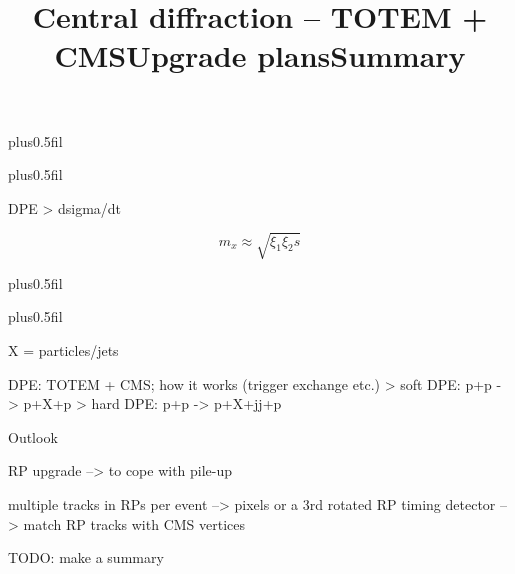 \vskip0pt plus0.5fil

\vskip0pt plus0.5fil

\newpage %
\title{}

\> DPE
\>> dsigma/dt

$$m_x \approx \sqrt{\xi_1 \xi_2 s}$$

\newpage %
\hbox{}
\vfil
\title{Central diffraction -- TOTEM + CMS}

\vskip0pt plus0.5fil

\vskip0pt plus0.5fil

\> X = particles/jets

\newpage %
\title{}

\> DPE: TOTEM + CMS; how it works (trigger exchange etc.)
\>> soft DPE: p+p -> p+X+p
\>> hard DPE: p+p -> p+X+jj+p

\newpage %
\title{}


\newpage %
\hbox{}
\vfil

\vskip2mm
\centerline{\PartFont\cYe Outlook\cFg}

\vfil


\newpage %
\title{Upgrade plans}

RP upgrade --> to cope with pile-up

\> multiple tracks in RPs per event --> pixels or a 3rd rotated RP
\> timing detector --> match RP tracks with CMS vertices

\newpage %
\title{}


\newpage %
\title{Summary}

TODO: make a summary

\vfil
\eject
\bye
